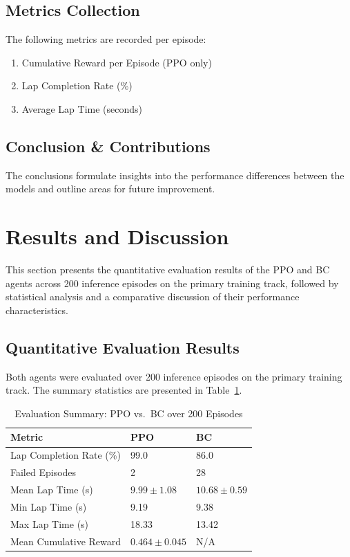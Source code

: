 \documentclass[conference]{IEEEtran}
\begin{document}
\subsection{Metrics Collection}
The following metrics are recorded per episode:
\begin{enumerate} 
\item Cumulative Reward per Episode (PPO only) 
\item Lap Completion Rate (\%) 
\item Average Lap Time (seconds) 
\end{enumerate}

\subsection{Conclusion \& Contributions}
The conclusions formulate insights into the performance differences between the models and outline areas for future improvement.

\section{Results and Discussion}
\label{sec:results}

This section presents the quantitative evaluation results of the PPO and BC agents across 200 inference episodes on the primary training track, followed by statistical analysis and a comparative discussion of their performance characteristics.

\subsection{Quantitative Evaluation Results}

Both agents were evaluated over 200 inference episodes on the primary training track. The summary statistics are presented in Table~\ref{tab:results_summary}.

\begin{table}[h]
\centering
\caption{Evaluation Summary: PPO vs.\ BC over 200 Episodes}
\label{tab:results_summary}
\renewcommand{\arraystretch}{1.2}
\begin{tabular}{|p{3.2cm}|p{2cm}|p{2cm}|}
\hline
Metric & PPO & BC \\ \hline
Lap Completion Rate (\%) & 99.0 & 86.0 \\ \hline
Failed Episodes & 2 & 28 \\ \hline
Mean Lap Time (s) & $9.99 \pm 1.08$ & $10.68 \pm 0.59$ \\ \hline
Min Lap Time (s) & 9.19 & 9.38 \\ \hline
Max Lap Time (s) & 18.33 & 13.42 \\ \hline
Mean Cumulative Reward & $0.464 \pm 0.045$ & N/A \\ \hline
\end{tabular}
\end{table}
\end{document}
